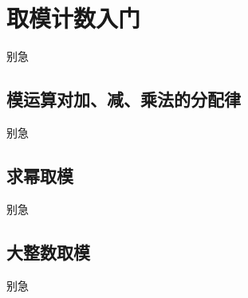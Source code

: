 
\section{取模计数入门}
\begin{frame}{别急}\end{frame} %
\subsection{模运算对加、减、乘法的分配律}
\begin{frame}[c]
  \progressnow*
\end{frame}
\begin{frame}{别急}\end{frame} %
\subsection{求幂取模}
\begin{frame}[c]
  \progressnow*
\end{frame}
\begin{frame}{别急}\end{frame} %
\subsection{大整数取模}
\begin{frame}[c]
  \progressnow*
\end{frame}
\begin{frame}{别急}\end{frame} %
